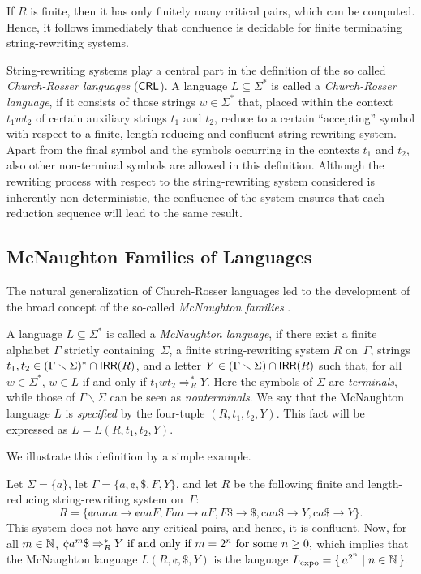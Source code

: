 If $R$ is finite, then it has only finitely many critical pairs, which can be computed. Hence, it follows immediately that confluence is decidable for finite terminating string-rewriting systems.

String-rewriting systems play a central part in the definition of the so called \emph{Church-Rosser languages} (\index{$\CRL$}$\CRL$). A language $L \subseteq \Sigma^*$ is called a \emph{Church-Rosser language}, if it consists of those strings $w \in \Sigma^*$ that, placed within the context $t_1 w t_2$ of certain auxiliary strings $t_1$ and $t_2$, reduce to a certain ``accepting'' symbol with respect to a finite, length-reducing and confluent string-rewriting system. Apart from the final symbol and the symbols occurring in the contexts $t_1$ and $t_2$, also other non-terminal symbols are allowed in this definition. Although the rewriting process with respect to the string-rewriting system considered is inherently non-deterministic, the confluence of the system ensures that each reduction sequence will lead to the same result.

\subsection{McNaughton Families of Languages}
\label{subsection:mcnaughton-families}

The natural generalization of Church-Rosser languages led to the development of the broad concept of the so-called \emph{McNaughton families} \cite{Beaudry2003}.

A language $L\subseteq \Sigma^*$ is called a \emph{McNaughton language}, if there exist a finite alphabet $\Gamma$ strictly containing~$\Sigma$, a finite string-rewriting system $R$ on~$\Gamma$, strings $t_1,t_2\in(\Gamma\smallsetminus\Sigma)^*\cap \textup{\sf IRR}(R)$, and a letter $Y\in(\Gamma\smallsetminus\Sigma)\cap \textup{\sf IRR}(R)$ such that, for all $w\in\Sigma^*$, $w\in L$ if and only if $t_1wt_2\Rightarrow^*_R Y$. Here the symbols of $\Sigma$ are \emph{terminals}, while those of $\Gamma\smallsetminus\Sigma$ can be seen as \emph{nonterminals}. We say that the McNaughton language $L$ is \emph{specified} by the four-tuple $(R,t_1,t_2,Y)$. This fact will be expressed as $L = L(R,t_1,t_2,Y)$.

We illustrate this definition by a simple example.

\begin{example}\label{ExMcNL}
Let $\Sigma=\{a\}$, let $\Gamma=\{a,\cent,\$,F,Y\}$, and let $R$ be the following finite and length-reducing string-rewriting system on~$\Gamma$:
$$R=\{\cent aaaa\to \cent aaF, Faa\to aF, F\$\to \$, \cent aa\$ \to Y, \cent a\$\to Y\}.$$ 
This system does not have any critical pairs, and hence, it is confluent. Now, for all $m\in \mathbb{N}$, $\cent a^m\$\Rightarrow_R^* Y\textup{ if and only if } m=2^n\textup{ for some }n\ge 0,$ which implies that the McNaughton language $L(R,\cent,\$,Y)$ is the language $L_{\rm expo} = \{\,a^{2^n}\mid n\in \mathbb{N}\,\}.$
\end{example}

